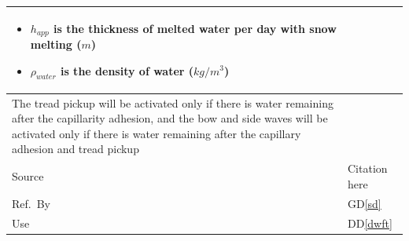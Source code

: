 \documentclass[12pt]{article}
\newcommand{\colAwidth}{0.13\textwidth}
\newcommand{\colBwidth}{0.82\textwidth}
\newcommand{\dref}[1]{GD\ref{#1}}
\newcommand{\ddref}[1]{DD\ref{#1}}
\begin{document}
\begin{minipage}{\textwidth}
\begin{tabular}{| p{\colAwidth} | p{\colBwidth}|}
\begin{itemize}
\item $h_{app}$ is the thickness of melted water per day with snow melting ($m$)

\item $\rho_{water}$ is the density of water ($kg/m^{3}$)

\end{itemize}

\\
\hline
The tread pickup will be activated only if there is water remaining after the capillarity adhesion, and the bow and side waves will be activated only if there is water remaining after the capillary adhesion and tread pickup
\\
\hline
  Source & Citation here \\
  \hline
  Ref.\ By & \dref{sd} \\ %
  \hline
  Use\ & \ddref{dwft}\\
  \hline
\end{tabular}

\end{minipage}\\
\end{document}

